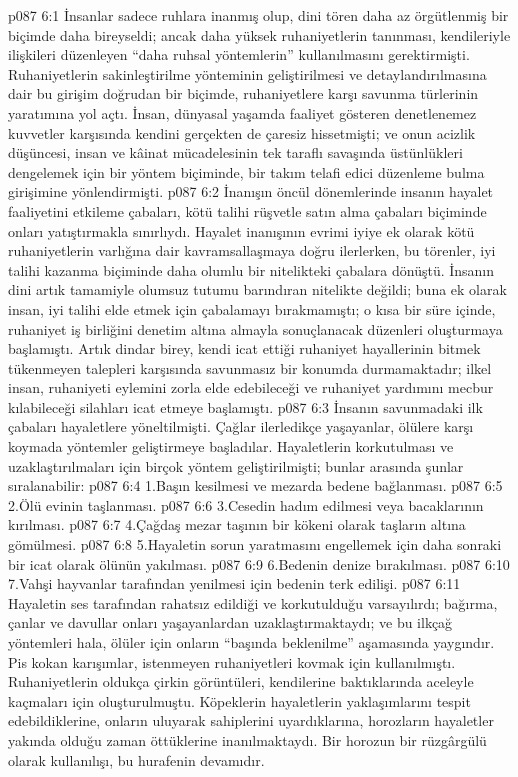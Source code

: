 \vs p087 6:1 İnsanlar sadece ruhlara inanmış olup, dini tören daha az örgütlenmiş bir biçimde daha bireyseldi; ancak daha yüksek ruhaniyetlerin tanınması, kendileriyle ilişkileri düzenleyen “daha ruhsal yöntemlerin” kullanılmasını gerektirmişti. Ruhaniyetlerin sakinleştirilme yönteminin geliştirilmesi ve detaylandırılmasına dair bu girişim doğrudan bir biçimde, ruhaniyetlere karşı savunma türlerinin yaratımına yol açtı. İnsan, dünyasal yaşamda faaliyet gösteren denetlenemez kuvvetler karşısında kendini gerçekten de çaresiz hissetmişti; ve onun acizlik düşüncesi, insan ve kâinat mücadelesinin tek taraflı savaşında üstünlükleri dengelemek için bir yöntem biçiminde, bir takım telafi edici düzenleme bulma girişimine yönlendirmişti.
\vs p087 6:2 İnanışın öncül dönemlerinde insanın hayalet faaliyetini etkileme çabaları, kötü talihi rüşvetle satın alma çabaları biçiminde onları yatıştırmakla sınırlıydı. Hayalet inanışının evrimi iyiye ek olarak kötü ruhaniyetlerin varlığına dair kavramsallaşmaya doğru ilerlerken, bu törenler, iyi talihi kazanma biçiminde daha olumlu bir nitelikteki çabalara dönüştü. İnsanın dini artık tamamiyle olumsuz tutumu barındıran nitelikte değildi; buna ek olarak insan, iyi talihi elde etmek için çabalamayı bırakmamıştı; o kısa bir süre içinde, ruhaniyet iş birliğini denetim altına almayla sonuçlanacak düzenleri oluşturmaya başlamıştı. Artık dindar birey, kendi icat ettiği ruhaniyet hayallerinin bitmek tükenmeyen talepleri karşısında savunmasız bir konumda durmamaktadır; ilkel insan, ruhaniyeti eylemini zorla elde edebileceği ve ruhaniyet yardımını mecbur kılabileceği silahları icat etmeye başlamıştı.
\vs p087 6:3 İnsanın savunmadaki ilk çabaları hayaletlere yöneltilmişti. Çağlar ilerledikçe yaşayanlar, ölülere karşı koymada yöntemler geliştirmeye başladılar. Hayaletlerin korkutulması ve uzaklaştırılmaları için birçok yöntem geliştirilmişti; bunlar arasında şunlar sıralanabilir:
\vs p087 6:4 1.\bibnobreakspace Başın kesilmesi ve mezarda bedene bağlanması.
\vs p087 6:5 2.\bibnobreakspace Ölü evinin taşlanması.
\vs p087 6:6 3.\bibnobreakspace Cesedin hadım edilmesi veya bacaklarının kırılması.
\vs p087 6:7 4.\bibnobreakspace Çağdaş mezar taşının bir kökeni olarak taşların altına gömülmesi.
\vs p087 6:8 5.\bibnobreakspace Hayaletin sorun yaratmasını engellemek için daha sonraki bir icat olarak ölünün yakılması.
\vs p087 6:9 6.\bibnobreakspace Bedenin denize bırakılması.
\vs p087 6:10 7.\bibnobreakspace Vahşi hayvanlar tarafından yenilmesi için bedenin terk edilişi.
\vs p087 6:11 Hayaletin ses tarafından rahatsız edildiği ve korkutulduğu varsayılırdı; bağırma, çanlar ve davullar onları yaşayanlardan uzaklaştırmaktaydı; ve bu ilkçağ yöntemleri hala, ölüler için onların “başında beklenilme” aşamasında yaygındır. Pis kokan karışımlar, istenmeyen ruhaniyetleri kovmak için kullanılmıştı. Ruhaniyetlerin oldukça çirkin görüntüleri, kendilerine baktıklarında aceleyle kaçmaları için oluşturulmuştu. Köpeklerin hayaletlerin yaklaşımlarını tespit edebildiklerine, onların uluyarak sahiplerini uyardıklarına, horozların hayaletler yakında olduğu zaman öttüklerine inanılmaktaydı. Bir horozun bir rüzgârgülü olarak kullanılışı, bu hurafenin devamıdır.
